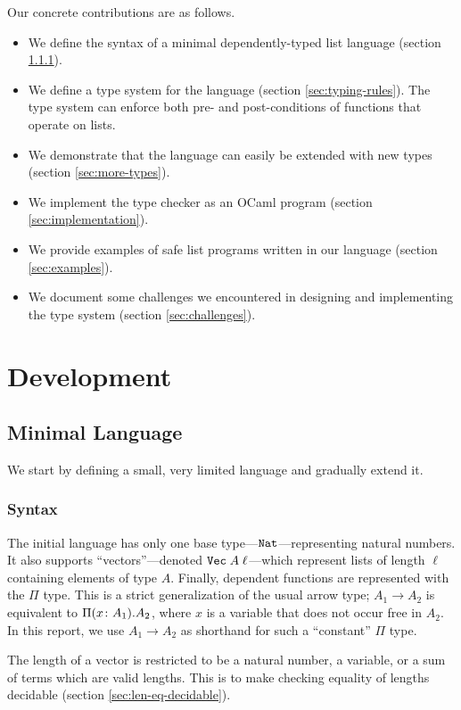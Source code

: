 \documentclass[acmsmall,nonacm]{acmart}
\begin{document}
Our concrete contributions are as follows.
\begin{itemize}
    \item We define the syntax of a minimal dependently-typed list language (section \ref{sec:syntax}).
    \item We define a type system for the language (section \ref{sec:typing-rules}).
    The type system can enforce both pre- and post-conditions of functions that operate on lists.
    \item We demonstrate that the language can easily be extended with new types (section \ref{sec:more-types}).
    \item We implement the type checker as an OCaml program (section \ref{sec:implementation}).
    \item We provide examples of safe list programs written in our language (section \ref{sec:examples}).
    \item We document some challenges we encountered in designing and implementing the type system (section \ref{sec:challenges}).
\end{itemize}

\section{Development}

\subsection{Minimal Language}

We start by defining a small, very limited language and gradually extend it.

\subsubsection{Syntax}
\label{sec:syntax}

The initial language has only one base type---$\texttt{Nat}$---representing natural numbers.
It also supports ``vectors''---denoted $\texttt{Vec} \; A \; \ell$---which represent lists of length $\ell$ containing elements of type $A$.
Finally, dependent functions are represented with the $\Pi$ type.
This is a strict generalization of the usual arrow type; $A_1 \rightarrow A_2$ is equivalent to $\Pi (x \colon A_1) . A_2$, where $x$ is a variable that does not occur free in $A_2$.
In this report, we use $A_1 \rightarrow A_2$ as shorthand for such a ``constant'' $\Pi$ type.

The length of a vector is restricted to be a natural number, a variable, or a sum of terms which are valid lengths.
This is to make checking equality of lengths decidable (section \ref{sec:len-eq-decidable}).
\end{document}
